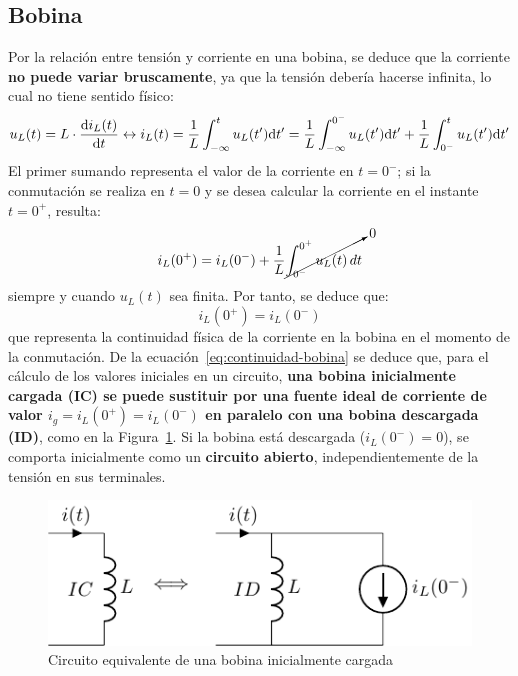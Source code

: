 \subsection{Bobina}
Por la relación entre tensión y corriente en una bobina, se deduce que
la corriente \textbf{no puede variar bruscamente}, ya que la tensión
debería hacerse infinita, lo cual no tiene sentido físico:
\begin{equation*}
  u_L(t) = L \cdot \diff{i_L(t)}{t}
  \leftrightarrow
  i_L(t) = \frac{1}{L} \int^t_{-\infty}u_L(t') \mathrm{d}t'= \frac{1}{L} \int^{0^-}_{-\infty}u_L(t')\mathrm{d}t' + \frac{1}{L} \int^{t}_{0^-}u_L(t')\mathrm{d}t'
\end{equation*}
El primer sumando representa el valor de la corriente en $t=0^-$; si
la conmutación se realiza en $t=0$ y se desea calcular la corriente en
el instante $t=0^+$, resulta:
\begin{equation*}
  i_L(0^+)=i_L(0^-)+ \dfrac{1}{L}\cancelto{0}{\int_{0^-}^{0^+} u_L(t)\, dt}
\end{equation*}
siempre y cuando $u_L(t)$ sea finita. Por tanto, se deduce que:
\begin{equation}\label{eq:continuidad-bobina}
  \boxed{i_L(0^+)=i_L(0^-)}
\end{equation}
que representa la continuidad física de la corriente en la bobina en
el momento de la conmutación. De la
ecuación~\eqref{eq:continuidad-bobina} se deduce que, para el cálculo
de los valores iniciales en un circuito, \textbf{una bobina
  inicialmente cargada (IC) se puede sustituir por una fuente ideal de
  corriente de valor $i_g=i_L(0^+)=i_L(0^-)$ en paralelo con una
  bobina descargada (ID)}, como en la
Figura~\ref{fig:condiciones_iniciales_L}. Si la bobina está descargada
($i_L(0^-)=0$), se comporta inicialmente como un \textbf{circuito
  abierto}, independientemente de la tensión en sus terminales.
\begin{figure}[H]
  \centering \includegraphics{../figs/condiciones_iniciales_L.pdf}
  \caption{Circuito equivalente de una bobina inicialmente cargada}
  \label{fig:condiciones_iniciales_L}
\end{figure}
	
